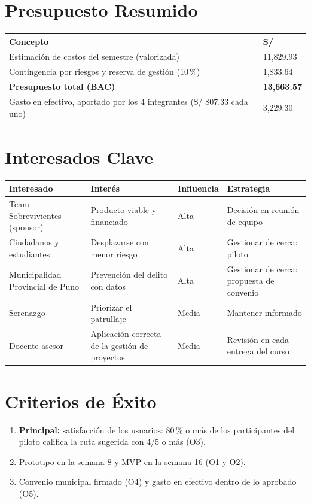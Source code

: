 \documentclass[11pt,a4paper]{article}
\begin{document}
\section{Presupuesto Resumido}
{\small
\noindent\begin{tabularx}{\textwidth}{@{}L Q{3.0cm}@{}}
\toprule
{}
\textbf{Concepto} & \textbf{S/} \\
\midrule
Estimación de costos del semestre (valorizada) & 11,829.93 \\
Contingencia por riesgos y reserva de gestión (10\,\%) & 1,833.64 \\
\textbf{Presupuesto total (BAC)} & \textbf{13,663.57} \\
Gasto en efectivo, aportado por los 4 integrantes (S/ 807.33 cada uno) & 3,229.30 \\
\bottomrule
\end{tabularx}
}

\section{Interesados Clave}
{\small
\noindent\begin{tabularx}{\textwidth}{@{}P{3.6cm} L C{1.6cm} L@{}}
\toprule
{}
\textbf{Interesado} & \textbf{Interés} & \textbf{Influencia} & \textbf{Estrategia} \\
\midrule
Team Sobrevivientes (sponsor) & Producto viable y financiado & Alta & Decisión en reunión de equipo \\
Ciudadanos y estudiantes & Desplazarse con menor riesgo & Alta & Gestionar de cerca: piloto \\
Municipalidad Provincial de Puno & Prevención del delito con datos & Alta & Gestionar de cerca: propuesta de convenio \\
Serenazgo & Priorizar el patrullaje & Media & Mantener informado \\
Docente asesor & Aplicación correcta de la gestión de proyectos & Media & Revisión en cada entrega del curso \\
\bottomrule
\end{tabularx}
}

\section{Criterios de Éxito}
\begin{enumerate}[leftmargin=*]
    \item \textbf{Principal:} satisfacción de los usuarios: 80\,\% o más de los participantes del piloto califica la ruta sugerida con 4/5 o más (O3).
    \item Prototipo en la semana 8 y MVP en la semana 16 (O1 y O2).
    \item Convenio municipal firmado (O4) y gasto en efectivo dentro de lo aprobado (O5).
\end{enumerate}
\end{document}
